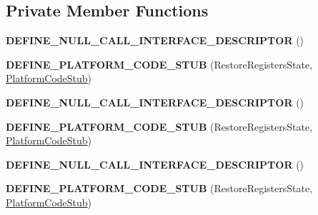 \subsection*{Private Member Functions}
\begin{DoxyCompactItemize}
\item 
{\bfseries D\+E\+F\+I\+N\+E\+\_\+\+N\+U\+L\+L\+\_\+\+C\+A\+L\+L\+\_\+\+I\+N\+T\+E\+R\+F\+A\+C\+E\+\_\+\+D\+E\+S\+C\+R\+I\+P\+T\+OR} ()\hypertarget{classv8_1_1internal_1_1_restore_registers_state_stub_ad6078d999bf4bc05859c3383b8b806f1}{}\label{classv8_1_1internal_1_1_restore_registers_state_stub_ad6078d999bf4bc05859c3383b8b806f1}

\item 
{\bfseries D\+E\+F\+I\+N\+E\+\_\+\+P\+L\+A\+T\+F\+O\+R\+M\+\_\+\+C\+O\+D\+E\+\_\+\+S\+T\+UB} (Restore\+Registers\+State, \hyperlink{classv8_1_1internal_1_1_platform_code_stub}{Platform\+Code\+Stub})\hypertarget{classv8_1_1internal_1_1_restore_registers_state_stub_a713ec890992c39eb89c6334070f5dbe4}{}\label{classv8_1_1internal_1_1_restore_registers_state_stub_a713ec890992c39eb89c6334070f5dbe4}

\item 
{\bfseries D\+E\+F\+I\+N\+E\+\_\+\+N\+U\+L\+L\+\_\+\+C\+A\+L\+L\+\_\+\+I\+N\+T\+E\+R\+F\+A\+C\+E\+\_\+\+D\+E\+S\+C\+R\+I\+P\+T\+OR} ()\hypertarget{classv8_1_1internal_1_1_restore_registers_state_stub_ad6078d999bf4bc05859c3383b8b806f1}{}\label{classv8_1_1internal_1_1_restore_registers_state_stub_ad6078d999bf4bc05859c3383b8b806f1}

\item 
{\bfseries D\+E\+F\+I\+N\+E\+\_\+\+P\+L\+A\+T\+F\+O\+R\+M\+\_\+\+C\+O\+D\+E\+\_\+\+S\+T\+UB} (Restore\+Registers\+State, \hyperlink{classv8_1_1internal_1_1_platform_code_stub}{Platform\+Code\+Stub})\hypertarget{classv8_1_1internal_1_1_restore_registers_state_stub_a713ec890992c39eb89c6334070f5dbe4}{}\label{classv8_1_1internal_1_1_restore_registers_state_stub_a713ec890992c39eb89c6334070f5dbe4}

\item 
{\bfseries D\+E\+F\+I\+N\+E\+\_\+\+N\+U\+L\+L\+\_\+\+C\+A\+L\+L\+\_\+\+I\+N\+T\+E\+R\+F\+A\+C\+E\+\_\+\+D\+E\+S\+C\+R\+I\+P\+T\+OR} ()\hypertarget{classv8_1_1internal_1_1_restore_registers_state_stub_ad6078d999bf4bc05859c3383b8b806f1}{}\label{classv8_1_1internal_1_1_restore_registers_state_stub_ad6078d999bf4bc05859c3383b8b806f1}

\item 
{\bfseries D\+E\+F\+I\+N\+E\+\_\+\+P\+L\+A\+T\+F\+O\+R\+M\+\_\+\+C\+O\+D\+E\+\_\+\+S\+T\+UB} (Restore\+Registers\+State, \hyperlink{classv8_1_1internal_1_1_platform_code_stub}{Platform\+Code\+Stub})\hypertarget{classv8_1_1internal_1_1_restore_registers_state_stub_a713ec890992c39eb89c6334070f5dbe4}{}\label{classv8_1_1internal_1_1_restore_registers_state_stub_a713ec890992c39eb89c6334070f5dbe4}


\end{DoxyCompactItemize}
